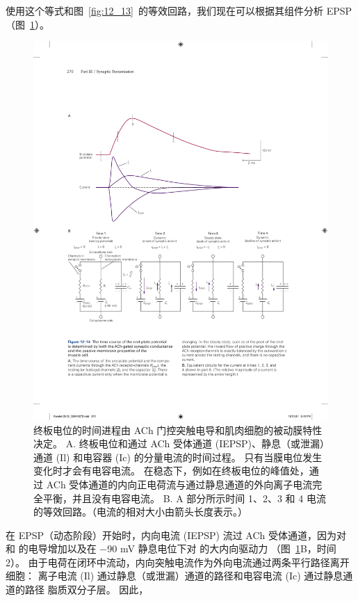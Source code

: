 使用这个等式和图~\ref{fig:12_13}~的等效回路，我们现在可以根据其组件分析 EPSP（图~\ref{fig:12_14}）。


\begin{figure}[htbp]
	\centering
	\includegraphics[width=0.95\linewidth]{chap12/fig_12_14}
	\caption{终板电位的时间进程由 ACh 门控突触电导和肌肉细胞的被动膜特性决定。 A. 终板电位和通过 ACh 受体通道 (IEPSP)、静息（或泄漏）通道 (Il) 和电容器 (Ic) 的分量电流的时间过程。 只有当膜电位发生变化时才会有电容电流。 在稳态下，例如在终板电位的峰值处，通过 ACh 受体通道的内向正电荷流与通过静息通道的外向离子电流完全平衡，并且没有电容电流。 B. A 部分所示时间 1、2、3 和 4 电流的等效回路。（电流的相对大小由箭头长度表示。）}
	\label{fig:12_14}
\end{figure}


在 EPSP（动态阶段）开始时，内向电流 (IEPSP) 流过 ACh 受体通道，因为对  和  的电导增加以及在 −90 mV 静息电位下对  的大内向驱动力 （图~\ref{fig:12_14}B，时间 2）。
由于电荷在闭环中流动，内向突触电流作为外向电流通过两条平行路径离开细胞：
离子电流 (Il) 通过静息（或泄漏）通道的路径和电容电流 (Ic) 通过静息通道的路径 脂质双分子层。
因此，


